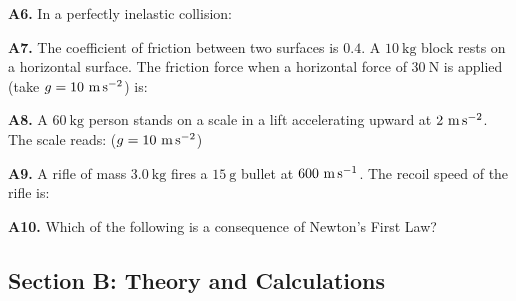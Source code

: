 \begin{exercisebox}[4]
\vspace{0.4cm}

\textbf{A6.} In a perfectly inelastic collision:


\vspace{0.4cm}

\textbf{A7.} The coefficient of friction between
two surfaces is $0.4$. A $10\ \text{kg}$ block rests
on a horizontal surface. The friction force when a
horizontal force of $30\ \text{N}$ is applied
(take $g = 10\ \text{m\,s}^{-2}$) is:


\vspace{0.4cm}

\textbf{A8.} A $60\ \text{kg}$ person stands on a
scale in a lift accelerating upward at
$2\ \text{m\,s}^{-2}$. The scale reads:
($g = 10\ \text{m\,s}^{-2}$)


\vspace{0.4cm}

\textbf{A9.} A rifle of mass $3.0\ \text{kg}$ fires
a $15\ \text{g}$ bullet at $600\ \text{m\,s}^{-1}$.
The recoil speed of the rifle is:


\vspace{0.4cm}

\textbf{A10.} Which of the following is a consequence
of Newton's First Law?


\vspace{0.6cm}

\subsection*{Section B: Theory and Calculations}


\end{exercisebox}
